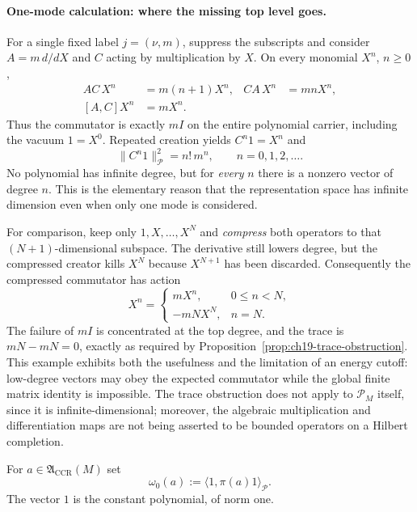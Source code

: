 \paragraph{One-mode calculation: where the missing top level goes.}
For a single fixed label $j=(\nu,m)$, suppress the subscripts and consider
$A=m\,d/dX$ and $C$ acting by multiplication by $X$.  On every monomial
$X^n$, $n\geq0$,
\begin{align}
 AC\,X^n&=m(n+1)X^n, & CA\,X^n&=mnX^n,\\
 [A,C]X^n&=mX^n.&&
 \label{eq:ch19-one-mode-ccr}
\end{align}
Thus the commutator is exactly $mI$ on the entire polynomial carrier,
including the vacuum $1=X^0$.  Repeated creation yields
$C^n1=X^n$ and
\begin{equation}
 \|C^n1\|_{\mathcal P}^2=n!\,m^n,
 \qquad n=0,1,2,\ldots .
 \label{eq:ch19-one-mode-norms}
\end{equation}
No polynomial has infinite degree, but for \emph{every} $n$ there is a
nonzero vector of degree $n$.  This is the elementary reason that the
representation space has infinite dimension even when only one mode is
considered.

For comparison, keep only $1,X,\ldots,X^N$ and \emph{compress} both
operators to that $(N+1)$-dimensional subspace.  The derivative still
lowers degree, but the compressed creator kills $X^N$ because $X^{N+1}$
has been discarded.  Consequently the compressed commutator has action
\begin{equation}
 [A_N,C_N]X^n=
 \begin{cases}
 mX^n,&0\leq n<N,\\
 -mN X^N,&n=N.
 \end{cases}
 \label{eq:ch19-top-degree-defect}
\end{equation}
The failure of $mI$ is concentrated at the top degree, and the trace is
$mN-mN=0$, exactly as required by
Proposition~\ref{prop:ch19-trace-obstruction}.  This example exhibits
both the usefulness and the limitation of an energy cutoff: low-degree
vectors may obey the expected commutator while the global finite matrix
identity is impossible.  The trace obstruction does not apply to
$\mathcal P_M$ itself, since it is infinite-dimensional; moreover, the
algebraic multiplication and differentiation maps are not being asserted
to be bounded operators on a Hilbert completion.

\begin{definition}
\label{def:ch19-polynomial-vacuum}
For $a\in\mathfrak A_{\mathrm{CCR}}(M)$ set
\begin{equation}
   \omega_0(a):=\langle1,\pi(a)1\rangle_{\mathcal P}.
   \label{eq:ch19-omega-zero}
\end{equation}
The vector $1$ is the constant polynomial, of norm one.
\end{definition}

